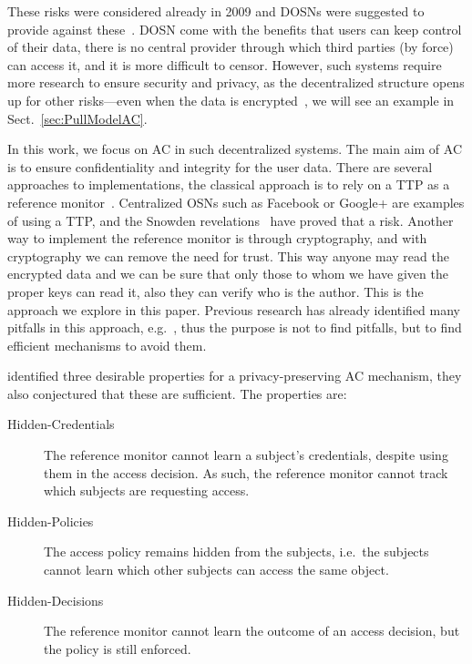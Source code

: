 These risks were considered already in 2009 and \acp{DOSN} were suggested to 
provide against these~\cite[e.g.][]{Peerson}.
\ac{DOSN} come with the benefits that users can keep control of their data, 
there is no central provider through which third parties (by force) can access 
it, and it is more difficult to censor.
However, such systems require more research to ensure security and privacy, as 
the decentralized structure opens up for other risks---even when the data is 
encrypted~\cite{DevilInMetadata}, we will see an example in 
Sect.~\ref{sec:PullModelAC}.

In this work, we focus on \ac{AC} in such decentralized systems.
The main aim of \ac{AC} is to ensure confidentiality and integrity for the user 
data.
There are several approaches to implementations, the classical approach is to 
rely on a \ac{TTP} as a reference monitor~\cite{AccessControl}.
Centralized \acp{OSN} such as Facebook or Google+ are examples of using 
a \ac{TTP}, and the Snowden revelations~\cite{prism} have proved that a risk.
Another way to implement the reference monitor is through cryptography, and 
with cryptography we can remove the need for trust.
This way anyone may read the encrypted data and we can be sure that only those 
to whom we have given the proper keys can read it, also they can verify who is 
the author.
This is the approach we explore in this paper.
Previous research has already identified many pitfalls in this approach, 
e.g.~\cite{DevilInMetadata}, thus the purpose is not to find pitfalls, but to 
find efficient mechanisms to avoid them.

\citet{TowardsPPACwHPHCHD} identified three desirable properties for 
a privacy-preserving \ac{AC} mechanism, they also conjectured that these are 
sufficient.
The properties are:
\begin{description}
  \item[Hidden-Credentials] The reference monitor cannot learn a subject's 
    credentials, despite using them in the access decision.
    As such, the reference monitor cannot track which subjects are requesting 
    access.
  \item[Hidden-Policies] The access policy remains hidden from the subjects, 
    i.e.\ the subjects cannot learn which other subjects can access the same 
    object.
  \item[Hidden-Decisions] The reference monitor cannot learn the outcome of an 
    access decision, but the policy is still enforced.
\end{description}

